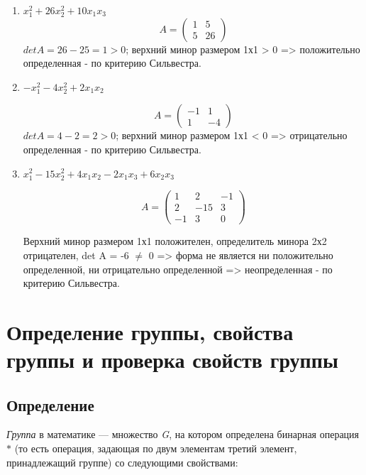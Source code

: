\documentclass[12pt]{article}
\begin{document}
\begin{enumerate}
    \item $x^2_{1} + 26x^2_{2} + 10x_{1}x_{3}$
          \[
              A = \left(
              \begin{array}{rrr}
                      1 & 5  \\
                      5 & 26
                  \end{array}
              \right)
          \]
          $det A = 26 - 25 = 1 > 0$; верхний минор размером 1х1 > 0 => положительно определенная - по критерию Сильвестра.

    \item $-x^2_{1} - 4x^2_{2} + 2x_{1}x_{2}$

          \[
              A = \left(
              \begin{array}{rrr}
                      -1 & 1  \\
                      1  & -4
                  \end{array}
              \right)
          \]
          $det A = 4 - 2 = 2 > 0$; верхний минор размером 1х1 < 0 => отрицательно определенная - по критерию Сильвестра.
    \item $x^2_{1} - 15x^2_{2} + 4x_{1}x_{2} - 2x_{1} x_{3} + 6x_{2} x_{3}$

          \[A = \left(
              \begin{array}{rrr}
                      1  & 2   & -1 \\
                      2  & -15 & 3  \\
                      -1 & 3   & 0
                  \end{array}
              \right)\]

          Верхний минор размером 1х1 положителен, определитель минора 2х2 отрицателен, det A = -6 $\neq$ 0 => форма не является ни положительно определенной, ни отрицательно определенной => неопределенная - по критерию Сильвестра.
\end{enumerate}

\section{Определение группы, свойства группы и проверка свойств группы}

\subsection{Определение}
\emph{Группа} в математике --- множество \emph{G}, на котором определена
бинарная операция $*$ (то есть операция, задающая по двум элементам третий
элемент, принадлежащий группе) со следующими свойствами:
\end{document}
